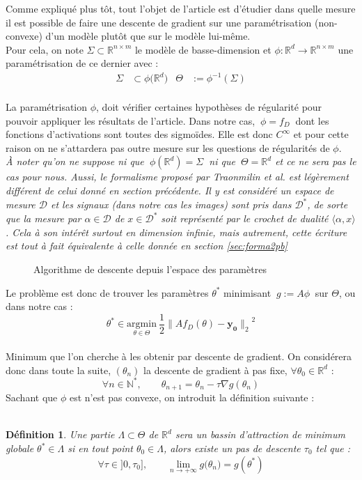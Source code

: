 \documentclass[hidelinks, french]{article} %
\newcommand{\N}{\mathbb{N}}
\newcommand{\R}{\mathbb{R}}
\newcommand{\lr}{\longrightarrow}
\newcommand{\etal}{\textit{et al. }}
\newcommand{\argmin}[1]{\underset{#1}{\text{argmin}}}
\renewcommand{\bf}[1]{\boldsymbol{#1}}
\theoremstyle{enonce}
\newtheorem{definition}{Définition}
\theoremstyle{special}
\theoremstyle{rq}
\theoremstyle{exo}
\theoremstyle{demo}
\begin{document}
Comme expliqué plus tôt, tout l'objet de l'article \cite{traonmilin_basins_2022} est d'étudier dans quelle mesure il est possible de faire une descente de gradient sur une paramétrisation (non-convexe) d'un modèle plutôt que sur le modèle lui-même. 
\\
Pour cela, on note $\Sigma\subset\R^{n\times m}$ le modèle de basse-dimension et $\phi: \R^d\lr\R^{n\times m}$ une paramétrisation de ce dernier avec :
\begin{align*}\Sigma&\subset\phi\big(\R^d\big)  &  \Theta&:=\phi^{-1}(\Sigma)\end{align*}
\\
La paramétrisation $\phi$, doit vérifier certaines hypothèses de régularité pour pouvoir appliquer les résultats de l'article. Dans notre cas, $\ \phi=f_D\ $ dont les fonctions d'activations sont toutes des sigmoïdes. Elle est donc $C^{\infty}$ et pour cette raison on ne s'attardera pas outre mesure sur les questions de régularités de $\phi$.
\\

\textit{\`A noter qu'on ne suppose ni que $\ \phi(\R^d)=\Sigma\ $ ni que  $\ \Theta=\R^d$ et ce ne sera pas le cas pour nous. Aussi, le formalisme proposé par Traonmilin \etal est légèrement différent de celui donné en section précédente. Il y est considéré un espace de mesure $\mathcal{D}$ et les signaux (dans notre cas les images) sont pris dans $\mathcal{D}^*$, de sorte que la mesure par $\alpha\in\mathcal{D}$ de $x\in\mathcal{D}^*$ soit représenté par le crochet de dualité $\langle \alpha,x\rangle$. Cela à son intérêt surtout en dimension infinie, mais autrement, cette écriture est tout à fait équivalente à celle donnée en section \ref{sec:forma2pb}}
\\

\begin{wrapfigure}{r}{0.43\textwidth}
    \caption{Algorithme de descente depuis l'espace des paramètres}
    \label{fig:pcode LGD}
\end{wrapfigure}

Le problème est donc de trouver les paramètres $\theta^*$ minimisant $\ g:=A\phi\ $ sur $\Theta$, ou dans notre cas :
\[\theta^*\in\argmin{\theta\in\Theta}\ \frac{1}{2}{\big\|Af_D(\theta)-\bf{y_0}\big\|_2}^2\]
\\
Minimum que l'on cherche à les obtenir par descente de gradient. On considérera donc dans toute la suite, $(\theta_n)$ la descente de gradient à pas fixe, $\forall\theta_0\in\R^d$ :
\[\forall n\in\N^*,\qquad \theta_{n+1} = \theta_n - \tau\nabla g(\theta_n)\]
Sachant que $\phi$ est n'est pas convexe, on introduit la définition suivante :
\\ \\
\begin{definition} 
Une partie $\Lambda\subset\Theta$ de $\R^d$ sera un \emph{bassin d'attraction} de minimum globale $\theta^*\in\Lambda$ si en tout point $\theta_0\in\Lambda$, alors existe un pas de descente $\tau_0$ tel que :
\[\forall \tau\in]0,\tau_0],\qquad \lim_{n\lr+\infty}g\big(\theta_n\big)=g(\theta^*)\]
\end{definition}
\end{document}
